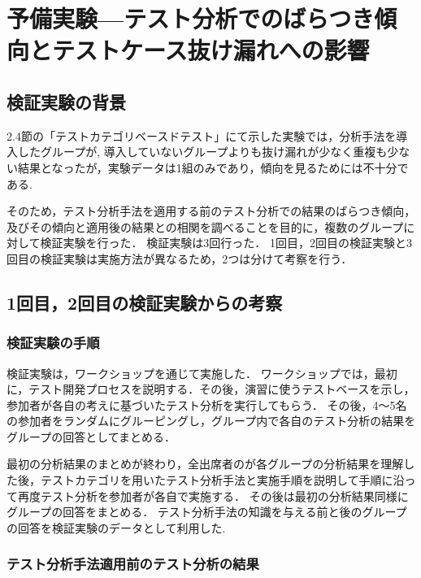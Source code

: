 \chapter{予備実験---テスト分析でのばらつき傾向とテストケース抜け漏れへの影響}\label{chap:3}
\section{検証実験の背景} \label{sec:3-1}
2.4節の「テストカテゴリベースドテスト」にて示した実験では，分析手法を導入したグループが, 導入していないグループよりも抜け漏れが少なく重複も少ない結果となったが，実験データは1組のみであり，傾向を見るためには不十分である.

そのため，テスト分析手法を適用する前のテスト分析での結果のばらつき傾向，及びその傾向と適用後の結果との相関を調べることを目的に，複数のグループに対して検証実験を行った．
検証実験は3回行った．
1回目，2回目の検証実験と3回目の検証実験は実施方法が異なるため，2つは分けて考察を行う．

\section{1回目，2回目の検証実験からの考察}
\subsection{検証実験の手順}
検証実験は，ワークショップを通じて実施した．
ワークショップでは，最初に，テスト開発プロセスを説明する．その後，演習に使うテストベースを示し，参加者が各自の考えに基づいたテスト分析を実行してもらう．
その後，4〜5名の参加者をランダムにグルーピングし，グループ内で各自のテスト分析の結果をグループの回答としてまとめる．

最初の分析結果のまとめが終わり，全出席者のが各グループの分析結果を理解した後，テストカテゴリを用いたテスト分析手法と実施手順を説明して手順に沿って再度テスト分析を参加者が各自で実施する．
その後は最初の分析結果同様にグループの回答をまとめる．
テスト分析手法の知識を与える前と後のグループの回答を検証実験のデータとして利用した.

\subsection{テスト分析手法適用前のテスト分析の結果}

